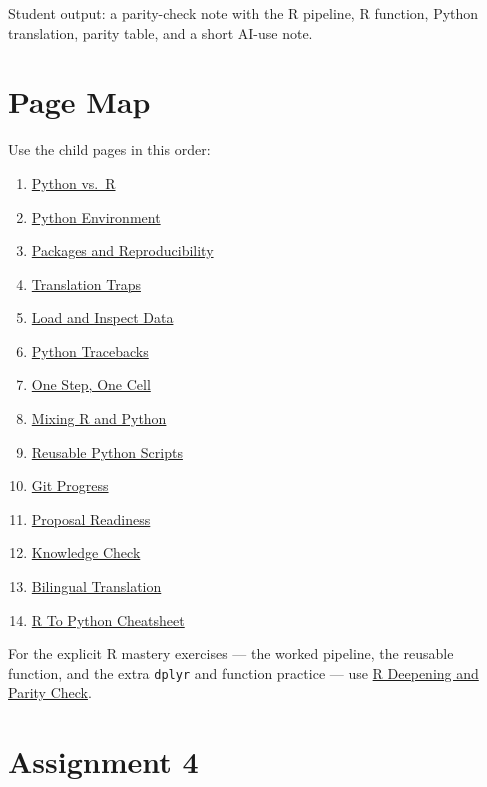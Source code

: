 \documentclass[
  letterpaper,
  DIV=11,
  numbers=noendperiod,
  oneside]{scrreprt}
\providecommand{\tightlist}{%
  \setlength{\itemsep}{0pt}\setlength{\parskip}{0pt}}
\begin{document}
Student output: a parity-check note with the R pipeline, R function,
Python translation, parity table, and a short AI-use note.

\section*{Page Map}\label{page-map}


Use the child pages in this order:

\begin{enumerate}
\def\labelenumi{\arabic{enumi}.}
\tightlist
\item
  \href{python01-when-and-why.qmd}{Python vs.~R}
\item
  \href{python02-environment.qmd}{Python Environment}
\item
  \href{python03-packages-reproducibility.qmd}{Packages and
  Reproducibility}
\item
  \href{python04-translation-traps.qmd}{Translation Traps}
\item
  \href{python05-load-inspect-data.qmd}{Load and Inspect Data}
\item
  \href{python06-tracebacks.qmd}{Python Tracebacks}
\item
  \href{python07-one-step-one-cell.qmd}{One Step, One Cell}
\item
  \href{python08-mixing-r-python.qmd}{Mixing R and Python}
\item
  \href{python09-reusable-scripts.qmd}{Reusable Python Scripts}
\item
  \href{python10-git-progress.qmd}{Git Progress}
\item
  \href{python11-project-milestone.qmd}{Proposal Readiness}
\item
  \href{python12-knowledge-check.qmd}{Knowledge Check}
\item
  \href{python13-translation-exercise.qmd}{Bilingual Translation}
\item
  \href{python14-cheat-sheet.qmd}{R To Python Cheatsheet}
\end{enumerate}

For the explicit R mastery exercises --- the worked pipeline, the
reusable function, and the extra \texttt{dplyr} and function practice
--- use \href{r-deepening-parity.qmd}{R Deepening and Parity Check}.

\section*{Assignment 4}\label{assignment-4}
\end{document}
